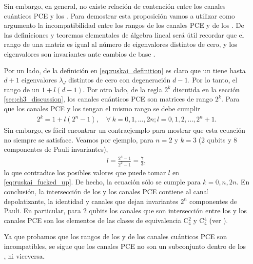 Sin embargo, en general, no existe relación de contención entre los canales cuánticos PCE 
y los \ruskai{}. Para demostrar esta proposición vamos a utilizar como 
argumento la incompatibilidad entre los rangos de los canales PCE
y de los \ruskai{}. 
De las definiciones y teoremas elementales de álgebra lineal será útil 
recordar que el rango de 
una matriz es igual al número de eigenvalores distintos de cero, y los eigenvalores
son invariantes ante cambios de base \cite{axler1997linear,lang2012introduction}. 

Por un lado, de la definición en \eqref{eq:ruskai_definition} es claro que un \ruskaiMap{}
tiene hasta $d+1$ eigenvalores $\lambda_J$ distintos de cero 
con degeneración $d-1$. Por lo tanto,
el rango de un \ruskaiMap{} $1+l(d-1)$. Por otro lado, 
de la regla $2^k$ discutida en la sección \ref{sec:ch3_discussion},
los canales cuánticos PCE son matrices de rango $2^k$. Para que los canales PCE
y los \ruskai{} tengan el mismo rango se debe cumplir 
\begin{align}\label{eq:ruskai_fucked_up}
2^k=1+l(2^n-1),\quad \forall \ k=0,1,\ldots,2n; l=0,1,2,\ldots,2^n+1.
\end{align}
Sin embargo, es fácil encontrar un contraejemplo para mostrar que esta
ecuación no siempre se satisface. Veamos por ejemplo, para $n=2$ y $k=3$
(2 qubits y 8 componentes de Pauli invariantes),
\begin{align}
l=\frac{2^3-1}{2^2-1}=\frac{7}{3},
\end{align}
lo que contradice los posibles valores que puede tomar $l$ 
en \eqref{eq:ruskai_fucked_up}. De hecho, la ecuación sólo se cumple 
para $k=0,n,2n$. En conclusión, la intersección de los \ruskai{}
y los canales PCE contiene al canal depolatizante, la identidad y canales 
que dejan invariantes $2^n$ componentes de Pauli. En particular, para 2 qubits 
los canales que son intersección entre los \ruskai{} y los canales PCE son los 
elementos de las clases de equivalencia C${}_4^2$ y C${}_4^4$
(ver ). 

Ya que probamos que los 
rangos de los \ruskai{} y de los canales cuánticos PCE son incompatibles, 
se sigue que los canales PCE no son un subconjunto dentro de los 
\ruskai{}, ni viceversa.





